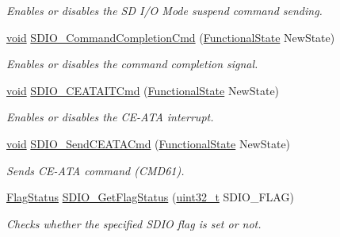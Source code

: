 \begin{DoxyCompactItemize}
\begin{DoxyCompactList}\small\item\em Enables or disables the SD I/O Mode suspend command sending. \end{DoxyCompactList}\item 
\hyperlink{usb__devapi_8h_afabf60e7f57651d6d595a02c75f07cd0}{void} \hyperlink{group___s_d_i_o___private___functions_ga1bbe98c629812bc62121d9c8b2c5e21b}{S\+D\+I\+O\+\_\+\+Command\+Completion\+Cmd} (\hyperlink{agilefox_2library_2inc_2stm32f10x__type_8h_ac9a7e9a35d2513ec15c3b537aaa4fba1}{Functional\+State} New\+State)
\begin{DoxyCompactList}\small\item\em Enables or disables the command completion signal. \end{DoxyCompactList}\item 
\hyperlink{usb__devapi_8h_afabf60e7f57651d6d595a02c75f07cd0}{void} \hyperlink{group___s_d_i_o___private___functions_gab44b8cbc21be000a291563076159503b}{S\+D\+I\+O\+\_\+\+C\+E\+A\+T\+A\+I\+T\+Cmd} (\hyperlink{agilefox_2library_2inc_2stm32f10x__type_8h_ac9a7e9a35d2513ec15c3b537aaa4fba1}{Functional\+State} New\+State)
\begin{DoxyCompactList}\small\item\em Enables or disables the C\+E-\/\+A\+TA interrupt. \end{DoxyCompactList}\item 
\hyperlink{usb__devapi_8h_afabf60e7f57651d6d595a02c75f07cd0}{void} \hyperlink{group___s_d_i_o___private___functions_ga8dc7f17804bdb745b42f6647c8487b4c}{S\+D\+I\+O\+\_\+\+Send\+C\+E\+A\+T\+A\+Cmd} (\hyperlink{agilefox_2library_2inc_2stm32f10x__type_8h_ac9a7e9a35d2513ec15c3b537aaa4fba1}{Functional\+State} New\+State)
\begin{DoxyCompactList}\small\item\em Sends C\+E-\/\+A\+TA command (C\+M\+D61). \end{DoxyCompactList}\item 
\hyperlink{agilefox_2library_2inc_2stm32f10x__type_8h_a89136caac2e14c55151f527ac02daaff}{Flag\+Status} \hyperlink{group___s_d_i_o___private___functions_ga644514b4b3c95c5c4326d99cd166f6f9}{S\+D\+I\+O\+\_\+\+Get\+Flag\+Status} (\hyperlink{_p_e___types_8h_a33594304e786b158f3fb30289278f5af}{uint32\+\_\+t} S\+D\+I\+O\+\_\+\+F\+L\+AG)
\begin{DoxyCompactList}\small\item\em Checks whether the specified S\+D\+IO flag is set or not. \end{DoxyCompactList}\item 

\end{DoxyCompactItemize}
